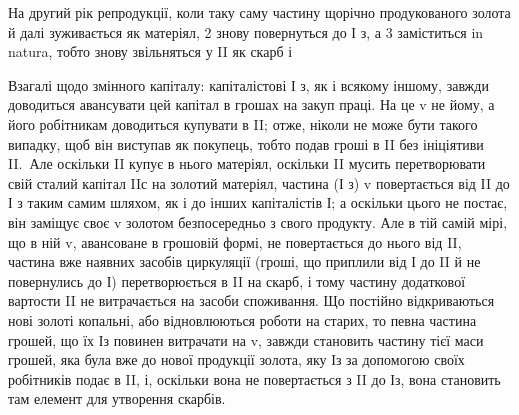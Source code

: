 На другий рік репродукції, коли таку саму частину щорічно продукованого
золота й далі зуживається як матеріял, 2 знову повернуться
до І з, а 3 заміститься in natura, тобто знову звільняться у II як скарб
і~

Взагалі щодо змінного капіталу: капіталістові І з, як і всякому
іншому, завжди доводиться авансувати цей капітал в грошах на закуп
праці. На це v не йому, а його робітникам доводиться купувати в II; отже,
ніколи не може бути такого випадку, щоб він виступав як покупець,
тобто подав гроші в II без ініціятиви II.~Але оскільки II купує в нього
матеріял, оскільки II мусить перетворювати свій сталий капітал IIс на золотий
матеріял, частина (І з) v повертається від II до І з таким самим шляхом,
як і до інших капіталістів І; а оскільки цього не постає, він заміщує своє v
золотом безпосередньо з свого продукту. Але в тій самій мірі, що в ній v,
авансоване в грошовій формі, не повертається до нього від II, частина
вже наявних засобів циркуляції (гроші, що приплили від І до II й не повернулись
до І) перетворюється в II на скарб, і тому частину додаткової
вартости II не витрачається на засоби споживання. Що постійно відкриваються
нові золоті копальні, або відновлюються роботи на старих,
то певна частина грошей, що їх Із повинен витрачати на v, завжди
становить частину тієї маси грошей, яка була вже до нової продукції
золота, яку Із за допомогою своїх робітників подає в II, і, оскільки
вона не повертається з II до Із, вона становить там елемент для
утворення скарбів.
